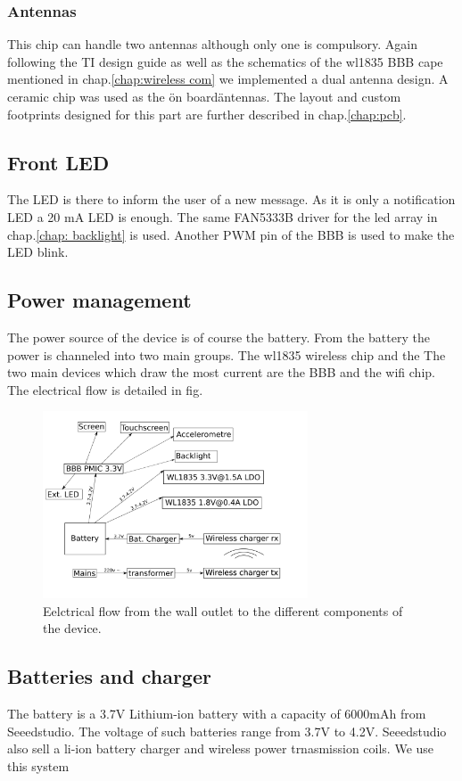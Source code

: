 \subsubsection{Antennas}
This chip can handle two antennas although only one is compulsory. Again following the TI design guide as well as the schematics of the wl1835 BBB cape mentioned in chap.\ref{chap:wireless com} we implemented a dual antenna design. A ceramic chip was used as the \"on board\" antennas. The layout and custom footprints designed for this part are further described in chap.\ref{chap:pcb}.
\subsection{Front LED}
The LED is there to inform the user of a new message. As it is only a notification LED a 20 mA LED is enough. The same FAN5333B driver for the led array in chap.\ref{chap: backlight} is used. Another PWM pin of the BBB is used to make the LED blink.
\subsection{Power management}
The power source of the device is of course the battery. From the battery the power is channeled into two main groups. The wl1835 wireless chip and the
The two main devices which draw the most current are the BBB and the wifi chip.
The electrical flow is detailed in fig.

\begin{figure}[!ht]
    \centering
    \includegraphics[width=0.7\textwidth,keepaspectratio]{chap/hardFig/vesta_power_management}
    \caption{Eelctrical flow from the wall outlet to the different components of the device.}
    \label{fig:power flow}
\end{figure}

\subsection{Batteries and charger}
The battery is a 3.7V Lithium-ion battery with a capacity of 6000mAh from Seeedstudio. The voltage of such batteries range from 3.7V to 4.2V. Seeedstudio also sell a li-ion battery charger and wireless power trnasmission coils. We use this system
